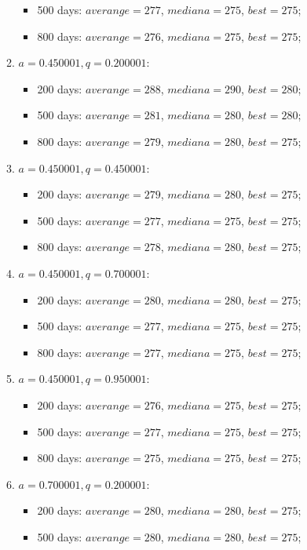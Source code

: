 \begin{enumerate}
\begin{enumerate}
\begin{itemize}
			\item 500 days: $averange = 277$, $mediana = 275$, $best = 275$;
			\item 800 days: $averange = 276$, $mediana = 275$, $best = 275$;
		\end{itemize}
		\item $a= 0.450001, q= 0.200001$:
		\begin{itemize}
			\item 200 days: $averange = 288$, $mediana = 290$, $best = 280$;
			\item 500 days: $averange = 281$, $mediana = 280$, $best = 280$;
			\item 800 days: $averange = 279$, $mediana = 280$, $best = 275$;
		\end{itemize}
		\item $a= 0.450001, q= 0.450001$:
		\begin{itemize}
			\item 200 days: $averange = 279$, $mediana = 280$, $best = 275$;
			\item 500 days: $averange = 277$, $mediana = 275$, $best = 275$;
			\item 800 days: $averange = 278$, $mediana = 280$, $best = 275$;
		\end{itemize}
		\item $a= 0.450001, q= 0.700001$:
		\begin{itemize}
			\item 200 days: $averange = 280$, $mediana = 280$, $best = 275$;
			\item 500 days: $averange = 277$, $mediana = 275$, $best = 275$;
			\item 800 days: $averange = 277$, $mediana = 275$, $best = 275$;
		\end{itemize}
		\item $a= 0.450001, q= 0.950001$:
		\begin{itemize}
			\item 200 days: $averange = 276$, $mediana = 275$, $best = 275$;
			\item 500 days: $averange = 277$, $mediana = 275$, $best = 275$;
			\item 800 days: $averange = 275$, $mediana = 275$, $best = 275$;
		\end{itemize}
		\item $a= 0.700001, q= 0.200001$:
		\begin{itemize}
			\item 200 days: $averange = 280$, $mediana = 280$, $best = 275$;
			\item 500 days: $averange = 280$, $mediana = 280$, $best = 275$;

\end{itemize}
\end{enumerate}
\end{enumerate}

